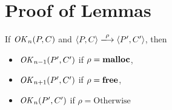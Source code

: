 \section{Proof of Lemmas}
\label{sec:proof}

\begin{lemma}
\label{lem:okPreserved}
If \(\mathit{OK}_n(P, C)\) and \( \langle P, C \rangle \xlongrightarrow{\rho} \langle P', C' \rangle\), then
\begin{itemize}
\item \(\mathit{OK}_{n-1}(P', C')\) if \(\rho = \mathbf{malloc}\),
\item \(\mathit{OK}_{n+1}(P', C')\) if \(\rho = \mathbf{free}\),
\item \(\mathit{OK}_n(P', C')\) if \(\rho = \mbox{Otherwise}  \)
\end{itemize}
\end{lemma}

